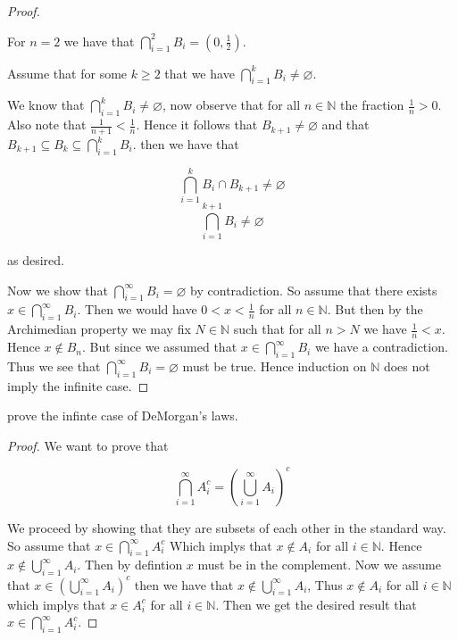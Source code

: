 \documentclass[11pt,largemargins]{homework}
\newcommand{\N}{\mathbb{N}}
\begin{document}
\begin{alphaparts}
\begin{proof}
        \begin{induction}
            \basecase
            For $n = 2$ we have that $\bigcap_{i = 1}^2 B_i = (0,\frac{1}{2})$. 

            \indhyp
            Assume that for some $k \geq 2$ that we have $\bigcap_{i = 1}^k B_i \neq \varnothing$.

            \indstep
            We know that $\bigcap_{i = 1}^k B_i \neq \varnothing$, now observe that for all $n \in \N$ the fraction $\frac{1}{n} > 0$. Also note that 
            $\frac{1}{n+1} < \frac{1}{n}$. Hence it follows that $B_{k+1} \neq \varnothing$ and that $B_{k+1} \subseteq B_k \subseteq \bigcap_{i = 1}^k B_i$. 
            then we have that 

            \[\bigcap_{i = 1}^k B_i \cap B_{k+1} \neq \varnothing \]
            \[\bigcap_{i =1}^{k+1} B_i \neq \varnothing \]

            as desired. 
                
            
        \end{induction}

        Now we show that $\bigcap_{i = 1}^{\infty} B_i = \varnothing$ by contradiction. So assume that there exists $x \in \bigcap_{i=1}^{\infty} B_i$. Then we would have $0 < x < \frac{1}{n}$ for all $n \in \N$. 
        But then by the Archimedian property we may fix $N \in \N$ such that for all $n > N$ we have $\frac{1}{n} < x $. Hence $x \notin B_n$. But since we assumed that $x \in \bigcap_{i = 1}^{\infty} B_i $
        we have a contradiction. Thus we see that $\bigcap_{i = 1}^{\infty} B_i = \varnothing$ must be true. Hence induction on $\N$ does not imply the infinite case. 


    \end{proof}




    \questionpart
    prove the infinte case of DeMorgan's laws. 

    \begin{proof}
        We want to prove that 

        \[\bigcap_{i = 1}^{\infty} A_i^c = \left(\bigcup_{i = 1}^{\infty} A_i \right)^c \]

        We proceed by showing that they are subsets of each other in the standard way. So assume that $x \in  \bigcap_{i = 1}^{\infty} A_i^c$
        Which implys that $x \notin A_i$ for all $i \in \N$. Hence $x \notin \bigcup_{i=1}^{\infty} A_i$. Then by defintion $x$ must be in the complement. 
        Now we assume that $x \in \left(\bigcup_{i=1}^{\infty} A_i \right)^c$ then we have that $x \notin \bigcup_{i=1}^{\infty} A_i $, Thus 
        $x \notin A_i$ for all $i \in \N$ which implys that $x \in A_i^c$ for all $i \in \N$. Then we get the desired result that $x \in \bigcap_{i=1}^{\infty} A_i^c$. 

    \end{proof}
\end{alphaparts}
\end{document}

